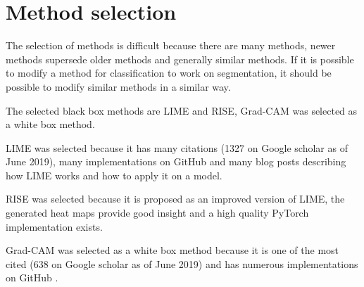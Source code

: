 \section{Method selection}
The selection of methods is difficult because there are many methods, newer methods supersede older methods and generally similar methods.
If it is possible to modify a method for classification to work on segmentation, it should be possible to modify similar methods in a similar way.

The selected black box methods are LIME and RISE, Grad-CAM was selected as a white box method.

LIME was selected because it has many citations (1327 on Google scholar as of June 2019), many implementations on GitHub and many blog posts describing how LIME works and how to apply it on a model.

RISE was selected because it is proposed as an improved version of LIME, the generated heat maps provide good insight and a high quality PyTorch implementation \cite{risegithub} exists.

Grad-CAM was selected as a white box method because it is one of the most cited (638 on Google scholar as of June 2019) and has numerous implementations on GitHub \cite{gradcamgithub}.
